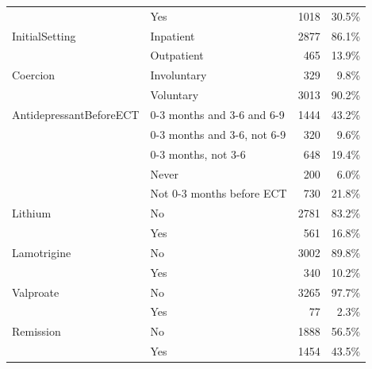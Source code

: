 \begin{longtable}{llrr}
 & Yes & 1018 & 30.5\% \\
InitialSetting & Inpatient & 2877 & 86.1\% \\
 & Outpatient & 465 & 13.9\% \\
Coercion & Involuntary & 329 & 9.8\% \\
 & Voluntary & 3013 & 90.2\% \\
AntidepressantBeforeECT & 0-3 months and 3-6 and 6-9 & 1444 & 43.2\% \\
 & 0-3 months and 3-6, not 6-9 & 320 & 9.6\% \\
 & 0-3 months, not 3-6 & 648 & 19.4\% \\
 & Never & 200 & 6.0\% \\
 & Not 0-3 months before ECT & 730 & 21.8\% \\
Lithium & No & 2781 & 83.2\% \\
 & Yes & 561 & 16.8\% \\
Lamotrigine & No & 3002 & 89.8\% \\
 & Yes & 340 & 10.2\% \\
Valproate & No & 3265 & 97.7\% \\
 & Yes & 77 & 2.3\% \\
Remission & No & 1888 & 56.5\% \\
 & Yes & 1454 & 43.5\% \\
\end{longtable}